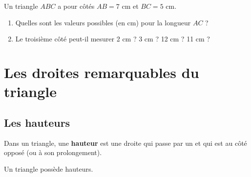 \begin{applicationbox}[Problème]
	Un triangle $ABC$ a pour côtés $AB = 7$ cm et $BC = 5$ cm.

	\begin{enumerate}[label=\alph*)]
		\item Quelles sont les valeurs possibles (en cm) pour la longueur $AC$ ?


		\item Le troisième côté peut-il mesurer 2 cm ? 3 cm ? 12 cm ? 11 cm ?

	\end{enumerate}
\end{applicationbox}

\section{Les droites remarquables du triangle}

\subsection{Les hauteurs}

\begin{definitionbox}
	Dans un triangle, une \textbf{hauteur} est une droite qui passe par un  et qui est  au côté opposé (ou à son prolongement).

	Un triangle possède  hauteurs.
\end{definitionbox}

